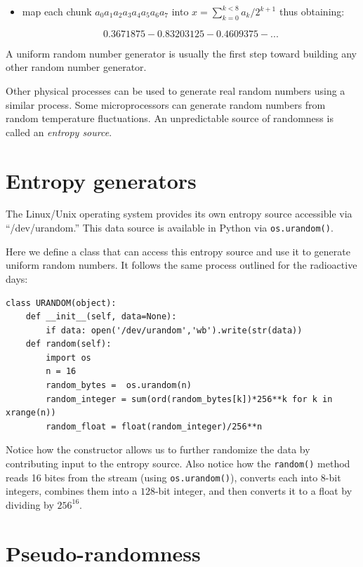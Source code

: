 \documentclass[justified,sixbynine]{tufte-book}
\def\ft{\small\tt}
\theoremstyle{plain}%
\theoremstyle{definition}
\theoremstyle{remark}
\begin{document}
\begin{fullwidth}
\begin{itemize}
\item  map each chunk $a_0a_1a_2a_3a_4a_5a_6a_7$ into $x=\sum_{k=0}^{k<8}a_k/2^{k+1}$
thus obtaining:

\begin{equation}
0.3671875 - 0.83203125 - 0.4609375 - ...
\end{equation}
\end{itemize}

A uniform random number generator is usually the first step toward building
any other random number generator.


Other physical processes can be used to generate real random numbers using a similar process.
Some microprocessors can generate random numbers from random temperature fluctuations.
An unpredictable source of randomness is called an {\it entropy source}.

\goodbreak\section{Entropy generators}

The Linux/Unix operating system provides its own entropy source accessible via ``/dev/urandom.'' This data source is available in Python via {\ft os.urandom()}.

Here we define a class that can access this entropy source and use it to generate uniform random numbers. It follows the same process outlined for the radioactive days:


\begin{lstlisting}
class URANDOM(object):
    def __init__(self, data=None):
        if data: open('/dev/urandom','wb').write(str(data))
    def random(self):
        import os
        n = 16
        random_bytes =  os.urandom(n)
        random_integer = sum(ord(random_bytes[k])*256**k for k in xrange(n))
        random_float = float(random_integer)/256**n
\end{lstlisting}

Notice how the constructor allows us to further randomize the data by contributing input to the entropy source. Also notice how the {\ft random()} method reads 16 bites from the stream (using {\ft os.urandom()}), converts each into $8$-bit integers, combines them into a $128$-bit integer, and then converts it to a float by dividing by $256^{16}$.

\goodbreak\section{Pseudo-randomness}


\end{fullwidth}
\end{document}

